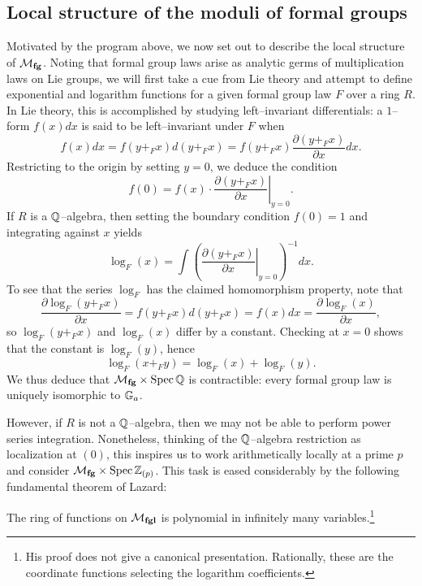 \subsection{Local structure of the moduli of formal groups}

Motivated by the program above, we now set out to describe the local structure of $\mathcal{M}_{\mathbf{fg}}$.  Noting that formal group laws arise as analytic germs of multiplication laws on Lie groups, we will first take a cue from Lie theory and attempt to define exponential and logarithm functions for a given formal group law $F$ over a ring $R$.  In Lie theory, this is accomplished by studying left--invariant differentials: a $1$--form $f(x) dx$ is said to be left--invariant under $F$ when \[f(x) dx = f(y +_F x) d(y +_F x) = f(y +_F x) \frac{\partial(y +_F x)}{\partial x} dx.\]  Restricting to the origin by setting $y = 0$, we deduce the condition \[f(0) = f(x) \cdot \left. \frac{\partial(y +_F x)}{\partial x} \right|_{y=0}.\]  If $R$ is a $\mathbb{Q}$--algebra, then setting the boundary condition $f(0) = 1$ and integrating against $x$ yields \[\log_F(x) = \int \left( \left. \frac{\partial(y +_F x)}{\partial x} \right|_{y=0} \right)^{-1} dx.\]  To see that the series $\log_F$ has the claimed homomorphism property, note that \[\frac{\partial \log_F(y +_F x)}{\partial x} = f(y +_F x) d(y +_F x) = f(x) dx = \frac{\partial \log_F(x)}{\partial x},\] so $\log_F(y +_F x)$ and $\log_F(x)$ differ by a constant.  Checking at $x = 0$ shows that the constant is $\log_F(y)$, hence \[\log_F(x +_F y) = \log_F(x) + \log_F(y).\]  We thus deduce that $\mathcal{M}_{\mathbf{fg}} \times \operatorname{Spec} \mathbb{Q}$ is contractible: every formal group law is uniquely isomorphic to $\mathbb G_a$.

However, if $R$ is not a $\mathbb{Q}$--algebra, then we may not be able to perform power series integration.  Nonetheless, thinking of the $\mathbb{Q}$--algebra restriction as localization at $(0)$, this inspires us to work arithmetically locally at a prime $p$ and consider $\mathcal{M}_{\mathbf{fg}} \times \operatorname{Spec} \mathbb Z_{(p)}$.  This task is eased considerably by the following fundamental theorem of Lazard:

\begin{theorem}
The ring of functions on $\mathcal{M}_{\mathbf{fgl}}$ is polynomial in infinitely many variables.\footnote{His proof does not give a canonical presentation.  Rationally, these are the coordinate functions selecting the logarithm coefficients.}
\end{theorem}

